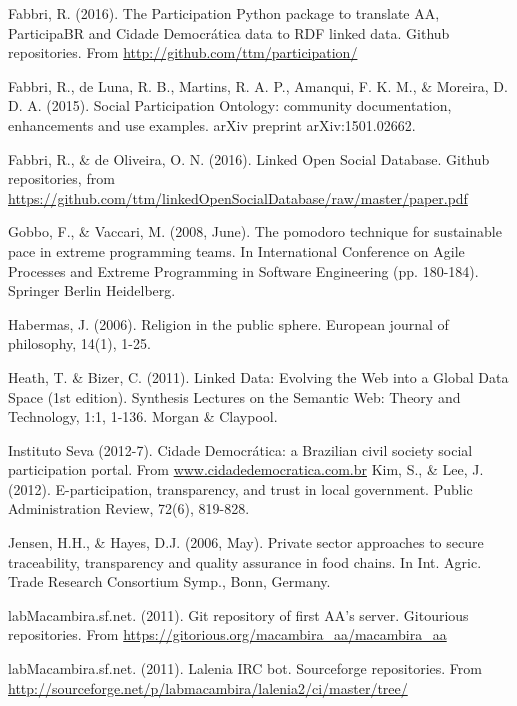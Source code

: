 \documentclass[12pt,fleqn]{article}
\begin{document}
\begin{thebibliography}{99}
	Fabbri, R. (2016). The Participation Python package to translate AA, ParticipaBR and Cidade Democrática data to RDF linked data.
		Github repositories. From \url{http://github.com/ttm/participation/}

Fabbri, R., de Luna, R. B., Martins, R. A. P., Amanqui, F. K. M., \& Moreira, D. D. A. (2015). Social Participation Ontology: community documentation, enhancements and use examples. arXiv preprint arXiv:1501.02662.

	Fabbri, R., \& de Oliveira, O. N. (2016). Linked Open Social Database. Github repositories, from \url{https://github.com/ttm/linkedOpenSocialDatabase/raw/master/paper.pdf}

Gobbo, F., \& Vaccari, M. (2008, June). The pomodoro technique for sustainable pace in extreme programming teams. In International Conference on Agile Processes and Extreme Programming in Software Engineering (pp. 180-184). Springer Berlin Heidelberg.

 Habermas, J. (2006). Religion in the public sphere. European journal of philosophy, 14(1), 1-25.

	Heath, T. \& Bizer, C. (2011). Linked Data: Evolving the Web into a Global Data Space (1st edition). Synthesis Lectures on the Semantic Web: Theory and Technology, 1:1, 1-136. Morgan \& Claypool.

Instituto Seva (2012-7). Cidade Democrática: a Brazilian civil society social participation portal. 
From \url{www.cidadedemocratica.com.br}
Kim, S., \& Lee, J. (2012). E-participation, transparency, and trust in local government. Public Administration Review, 72(6), 819-828.

Jensen, H.H., \& Hayes, D.J. (2006, May). Private sector approaches to secure traceability, transparency and quality assurance in food chains. In Int. Agric. Trade Research Consortium Symp., Bonn, Germany.

	labMacambira.sf.net. (2011). Git repository of first AA's server.
		Gitourious repositories. From \url{https://gitorious.org/macambira_aa/macambira_aa}

	labMacambira.sf.net. (2011). Lalenia IRC bot.
		Sourceforge repositories. From \url{http://sourceforge.net/p/labmacambira/lalenia2/ci/master/tree/}


\end{thebibliography}
\end{document}
